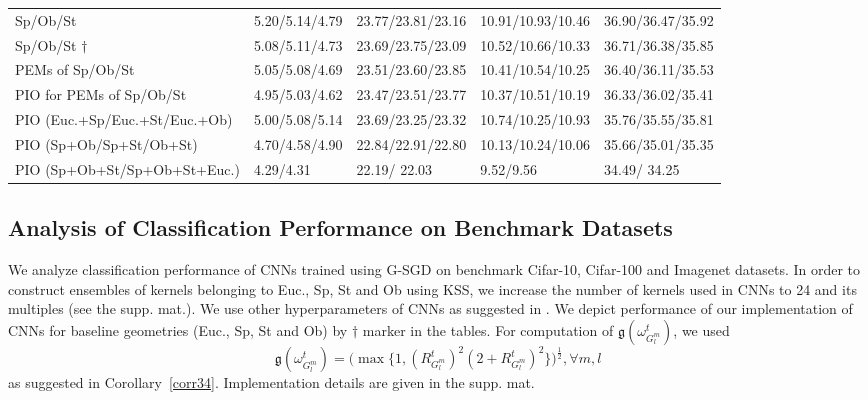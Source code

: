 \documentclass[10pt,journal,compsoc]{IEEEtran}
\theoremstyle{definition}
\theoremstyle{definition}
\theoremstyle{remark}
\theoremstyle{remark}
\theoremstyle{remark}
\begin{document}
\begin{table*}[ht]
\begin{tabular}{C{4.8cm}|C{1.7cm}|C{2.250cm}|C{2.69cm}|C{2.69cm}|}
		Sp/Ob/St \cite{oo16} & 5.20/5.14/{{4.79}}  & 23.77/23.81/{{23.16}} & 10.91/10.93/{{10.46}} & 36.90/36.47/{{35.92}} \\
		Sp/Ob/St $\dagger$ & 5.08/5.11/{{4.73}}  & 23.69/23.75/{{23.09}} & 10.52/10.66/{{10.33}} & 36.71/36.38/{{35.85}} \\
		PEMs of Sp/Ob/St & 5.05/5.08/{{4.69}}  & 23.51/23.60/{{23.85}} & 10.41/10.54/{{10.25}} & 36.40/36.11/{{35.53}} \\
		PIO for PEMs of Sp/Ob/St & 4.95/5.03/{{4.62}}  & 23.47/23.51/{{23.77}} & 10.37/10.51/{{10.19}} & 36.33/36.02/{{35.41}} \\		
		PIO   (Euc.+Sp/Euc.+St/Euc.+Ob)  & 5.00/5.08/5.14  & 23.69/23.25/23.32  & 10.74/10.25/10.93  & 35.76/35.55/35.81 \\	
		PIO   (Sp+Ob/Sp+St/Ob+St)  & 4.70/4.58/4.90  & 22.84/22.91/22.80  & 10.13/10.24/10.06  & 35.66/35.01/35.35 \\		
		PIO (Sp+Ob+St/Sp+Ob+St+Euc.)  & {\color{blue} 4.29}/4.31   & 22.19/{\color{blue} 22.03}  &  {\color{blue} 9.52}/9.56 & 34.49/{\color{blue} 34.25} \\
		\bottomrule
		\bottomrule
								
	\end{tabular}%
	\label{tab:rcd}%
\end{table*}%


\subsection{Analysis of Classification Performance on Benchmark Datasets}

We analyze classification performance of CNNs trained using G-SGD on benchmark Cifar-10, Cifar-100 and Imagenet datasets. In order to construct ensembles of kernels belonging to Euc., Sp, St and Ob using KSS, we increase the number of kernels used in CNNs to 24 and its multiples (see the supp. mat.). We use other hyperparameters of CNNs as suggested in  \cite{res_net,SN,oo16}. We depict performance of our implementation of  CNNs for baseline geometries (Euc., Sp, St and Ob) by $\dagger$ marker in the tables. For computation of  $\mathfrak{g}(\omega_{G^m_l}^t)$, we used 
\begin{equation}{\mathfrak{g}(\omega_{G^m_l}^t) = (\max\{ 1, (R_{G^m_l}^{t})^2(2+R_{G^m_l}^{t})^2 \} })^{\frac{1}{2}}, \forall m,l
\end{equation}
as suggested in Corollary~\ref{corr34}. Implementation details are given in the supp. mat.  
\end{document}
